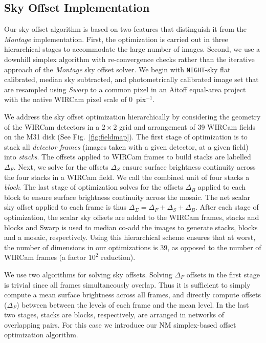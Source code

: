 \documentclass[iop]{emulateapj}
\newcommand{\sw}[1]{\textit{#1}} %
\newcommand{\Fig}[1]{Fig.~\ref{fig:#1}}  %
\begin{document}
\subsection{Sky Offset Implementation}
\label{sec:msrnm_algo}

Our sky offset algorithm is based on two features that distinguish it from the \sw{Montage} implementation.
First, the optimization is carried out in three hierarchical stages to accommodate the large number of images.
Second, we use a downhill simplex algorithm \cite[][hereafter, NM]{Nelder:1965} with re-convergence checks rather than the iterative approach of the \sw{Montage} sky offset solver.
We begin with \texttt{NIGHT}-sky flat calibrated, median sky subtracted, and photometrically calibrated image set that are resampled using \sw{Swarp} to a common pixel in an Aitoff equal-area project with the native WIRCam pixel scale of 0~pix$^{-1}$.

We address the sky offset optimization hierarchically by considering the geometry of the WIRCam detectors in a $2 \times 2$ grid and arrangement of 39 WIRCam fields on the M31 disk (See \Fig{fieldmap}).
The first stage of optimization is to stack all \emph{detector frames} (images taken with a given detector, at a given field) into \emph{stacks}.
The offsets applied to WIRCam frames to build stacks are labelled $\Delta_F$.
Next, we solve for the offsets $\Delta_S$ ensure surface brightness continuity across the four stacks in a WIRCam field.
We call the combined unit of four stacks a \emph{block}.
The last stage of optimization solves for the offsets $\Delta_B$ applied to each block to ensure surface brightness continuity across the mosaic.
The net scalar sky offset applied to each frame is thus $\Delta_\Sigma = \Delta_F + \Delta_S + \Delta_B$.
After each stage of optimization, the scalar sky offsets are added to the WIRCam frames, stacks and blocks and Swarp is used to median co-add the images to generate stacks, blocks and a mosaic, respectively.
Using this hierarchical scheme ensures that at worst, the number of dimensions in our optimizations is 39, as opposed to the number of WIRCam frames (a factor $10^2$ reduction).

We use two algorithms for solving sky offsets.
Solving $\Delta_F$ offsets in the first stage is trivial since all frames simultaneously overlap.
Thus it is sufficient to simply compute a mean surface brightness across all frames, and directly compute offsets ($\Delta_F$) between between the levels of each frame and the mean level.
In the last two stages, stacks are blocks, respectively, are arranged in networks of overlapping pairs.
For this case we introduce our NM simplex-based offset optimization algorithm.
\end{document}
